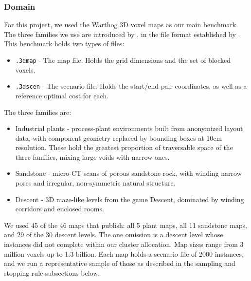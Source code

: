 \documentclass[letterpaper]{article} %
\begin{document}
\subsubsection{Domain}
For this project, we used the Warthog 3D voxel maps as our main benchmark. The three families we use are introduced by \citet{nobes2023voxel}, in the file format established by \citet{brewer2018voxel}. This benchmark holds two types of files:
\begin{itemize}
  \item \texttt{.3dmap} - The map file. Holds the grid dimensions and the set of blocked voxels.
  \item \texttt{.3dscen} - The scenario file. Holds the start/end pair coordinates, as well as a reference optimal cost for each.
\end{itemize} The three families are:
\begin{itemize}
  \item Industrial plants - process-plant environments built from anonymized layout data, with component geometry replaced by bounding boxes at 10cm resolution. These hold the greatest proportion of traversable space of the three families, mixing large voids with narrow ones.
  \item Sandstone - micro-CT scans of porous sandstone rock, with winding narrow pores and irregular, non-symmetric natural structure.
  \item Descent - 3D maze-like levels from the game Descent, dominated by winding corridors and enclosed rooms.
\end{itemize} We used 45 of the 46 maps that \citet{nobes2023voxel} publish: all 5 plant maps, all 11 sandstone maps, and 29 of the 30 descent levels. The one omission is a descent level whose instances did not complete within our cluster allocation. Map sizes range from 3 million voxels up to 1.3 billion. Each map holds a scenario file of 2000 instances, and we run a representative sample of those as described in the sampling and stopping rule subsections below.
\end{document}
